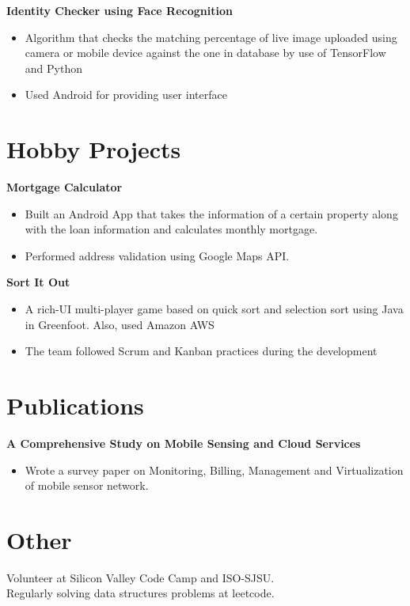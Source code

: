 \documentclass[margin]{res}
\begin{document}
\begin{resume}
 {\bf Identity Checker using Face Recognition }
 \begin{itemize} \itemsep -2pt  %
 \item Algorithm that checks the matching percentage of live image uploaded using camera or mobile device against the one in database by use of TensorFlow and Python
 \item Used Android for providing user interface
 \end{itemize}
 
 \section{Hobby Projects}
 
 {\bf Mortgage Calculator }
 \begin{itemize} \itemsep -2pt  %
 \item Built an Android App that takes the information of a certain property along with the loan information and calculates monthly mortgage. 
 \item Performed address validation using Google Maps API.
 \end{itemize}
 
{\bf Sort It Out }
 \begin{itemize} \itemsep -2pt  %
 \item A rich-UI multi-player game based on quick sort and selection sort using Java in Greenfoot. Also, used Amazon AWS 
 \item The team followed Scrum and Kanban practices during the development 
 \end{itemize}
\section{Publications}
 
 {\bf A Comprehensive Study on Mobile Sensing and Cloud Services }
 \begin{itemize} \itemsep -2pt  %
\item Wrote a survey paper on Monitoring, Billing, Management and Virtualization of mobile sensor network.
  \end{itemize}
 

 
\section{Other}
 Volunteer at Silicon Valley Code Camp and ISO-SJSU.\\
 Regularly solving data structures problems at leetcode. \\

\end{resume}
\end{document}
